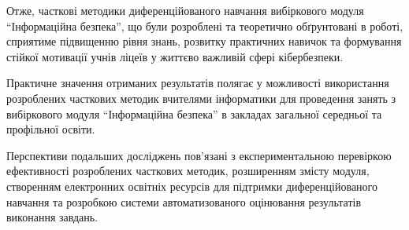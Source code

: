 Отже, часткові методики диференційованого навчання вибіркового модуля ``Інформаційна безпека'', що були розроблені та теоретично обґрунтовані в роботі, сприятиме підвищенню рівня знань, розвитку практичних навичок та формування стійкої мотивації учнів ліцеїв у життєво важливій сфері кібербезпеки.

Практичне значення отриманих результатів полягає у можливості використання розроблених часткових методик вчителями інформатики для проведення занять з вибіркового модуля ``Інформаційна безпека'' в закладах загальної середньої та профільної освіти.

Перспективи подальших досліджень пов'язані з експериментальною перевіркою ефективності розроблених часткових методик, розширенням змісту модуля, створенням електронних освітніх ресурсів для підтримки диференційованого навчання та розробкою системи автоматизованого оцінювання результатів виконання завдань.









    
    
    
